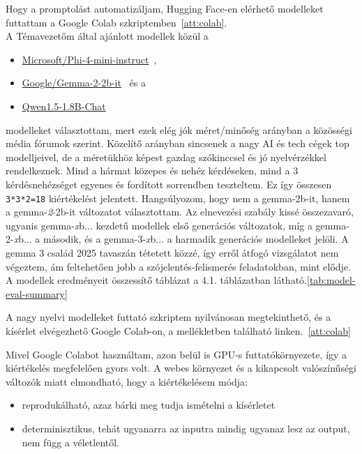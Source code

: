 \documentclass[12pt]{report}
\theoremstyle{definition}
\begin{document}
Hogy a promptolást automatizáljam, Hugging Face-en elérhető modelleket futtattam a Google Colab szkriptemben~\ref{att:colab}.\\ A Témavezetőm által ajánlott modellek közül a
\begin{itemize}
    \item \href{https://huggingface.co/microsoft/Phi-4-mini-instruct}{Microsoft/Phi-4-mini-instruct}~\cite{phi4mini2024},
    \item \href{https://huggingface.co/google/gemma-2-2b-it}{Google/Gemma-2-2b-it}~\cite{gemma22b2024} és a
    \item \href{https://huggingface.co/Qwen/Qwen1.5-1.8B-Chat}{Qwen1.5-1.8B-Chat}~\cite{qwen15chat2024}
\end{itemize}
 modelleket választottam, mert ezek elég jók méret/minőség arányban a közösségi média fórumok szerint. Közelítő arányban sincsenek a nagy AI és tech cégek top modelljeivel, de a méretükhöz képest gazdag szókinccsel és jó nyelvérzékkel rendelkeznek. Mind a hármat közepes és nehéz kérdéseken, mind a 3 kérdésnehézséget egyenes és fordított sorrendben teszteltem. Ez így összesen \texttt{3*3*2=18} kiértékelést jelentett. Hangsúlyozom, hogy nem a {gemma-2b-it}, hanem a {gemma-\textit{2}-2b-it} változatot választottam. Az elnevezési szabály kissé összezavaró, ugyanis {gemma-\textit{x}b...} kezdetű modellek első generációs változatok, míg a {gemma-2-\textit{x}b...} a második, és a {gemma-3-\textit{x}b...} a harmadik generációs modelleket jelöli. A gemma 3 család 2025 tavaszán tétetett közzé, így erről átfogó vizsgálatot nem végeztem, ám feltehetően jobb a szójelentés-felismerés feladatokban, mint elődje.
A modellek eredményeit összessítő táblázat a 4.1. táblázatban látható.\ref{tab:model-eval-summary}


A nagy nyelvi modelleket futtató szkriptem nyilvánosan megtekinthető, és a kísérlet elvégezhető Google Colab-on, a mellékletben található linken.~\ref{att:colab}

Mivel Google Colabot használtam, azon belül is GPU-s futtatókörnyezete, így a kiértékelés megfelelően gyors volt.
A webes környezet és a kikapcsolt valószínűségi változók miatt elmondható, hogy a kiértékelésem módja:
\begin{itemize}
	\item reprodukálható, azaz bárki meg tudja ismételni a kísérletet
	\item determinisztikus, tehát ugyanarra az inputra mindig ugyanaz lesz az output, nem függ a véletlentől.
\end{itemize}
\end{document}
